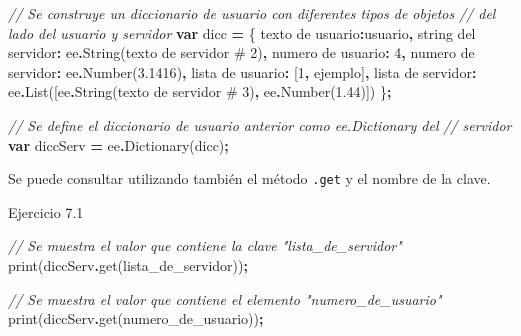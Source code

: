 \documentclass[
  12pt,
  letterpaper,
  twoside]{book}
\newenvironment{Shaded}{\begin{snugshade}}{\end{snugshade}}
\newcommand{\CommentTok}[1]{\textcolor[rgb]{0.56,0.35,0.01}{\textit{#1}}}
\newcommand{\DecValTok}[1]{\textcolor[rgb]{0.00,0.00,0.81}{#1}}
\newcommand{\FloatTok}[1]{\textcolor[rgb]{0.00,0.00,0.81}{#1}}
\newcommand{\FunctionTok}[1]{\textcolor[rgb]{0.00,0.00,0.00}{#1}}
\newcommand{\KeywordTok}[1]{\textcolor[rgb]{0.13,0.29,0.53}{\textbf{#1}}}
\newcommand{\NormalTok}[1]{#1}
\newcommand{\OperatorTok}[1]{\textcolor[rgb]{0.81,0.36,0.00}{\textbf{#1}}}
\newcommand{\StringTok}[1]{\textcolor[rgb]{0.31,0.60,0.02}{#1}}
\begin{document}
\begin{Shaded}
\begin{Highlighting}[]
\CommentTok{// Se construye un diccionario de usuario con diferentes tipos de objetos}
\CommentTok{// del lado del usuario y servidor}
\KeywordTok{var}\NormalTok{ dicc }\OperatorTok{=}\NormalTok{ \{                                                 }
  \StringTok{\textquotesingle{}texto de usuario\textquotesingle{}}\OperatorTok{:}\StringTok{\textquotesingle{}usuario\textquotesingle{}}\OperatorTok{,}
  \StringTok{\textquotesingle{}string del servidor\textquotesingle{}}\OperatorTok{:}\NormalTok{ ee}\OperatorTok{.}\FunctionTok{String}\NormalTok{(}\StringTok{\textquotesingle{}texto de servidor \# 2\textquotesingle{}}\NormalTok{)}\OperatorTok{,}
  \StringTok{\textquotesingle{}numero de usuario\textquotesingle{}}\OperatorTok{:} \DecValTok{4}\OperatorTok{,}
  \StringTok{\textquotesingle{}numero de servidor\textquotesingle{}}\OperatorTok{:}\NormalTok{ ee}\OperatorTok{.}\FunctionTok{Number}\NormalTok{(}\FloatTok{3.1416}\NormalTok{)}\OperatorTok{,}
  \StringTok{\textquotesingle{}lista de usuario\textquotesingle{}}\OperatorTok{:}\NormalTok{ [}\DecValTok{1}\OperatorTok{,} \StringTok{\textquotesingle{}ejemplo\textquotesingle{}}\NormalTok{]}\OperatorTok{,}
  \StringTok{\textquotesingle{}lista de servidor\textquotesingle{}}\OperatorTok{:}\NormalTok{ ee}\OperatorTok{.}\FunctionTok{List}\NormalTok{([ee}\OperatorTok{.}\FunctionTok{String}\NormalTok{(}\StringTok{\textquotesingle{}texto de servidor \# 3\textquotesingle{}}\NormalTok{)}\OperatorTok{,} 
\NormalTok{    ee}\OperatorTok{.}\FunctionTok{Number}\NormalTok{(}\FloatTok{1.44}\NormalTok{)])}
\NormalTok{\}}\OperatorTok{;} 

\CommentTok{// Se define el diccionario de usuario anterior como ee.Dictionary del }
\CommentTok{// servidor }
\KeywordTok{var}\NormalTok{ diccServ }\OperatorTok{=}\NormalTok{ ee}\OperatorTok{.}\FunctionTok{Dictionary}\NormalTok{(dicc)}\OperatorTok{;}     
\end{Highlighting}
\end{Shaded}

Se puede consultar utilizando también el método \texttt{.get} y el nombre de la clave.

Ejercicio 7.1

\begin{Shaded}
\begin{Highlighting}[]
\CommentTok{// Se muestra el valor que contiene la clave "lista\_de\_servidor"}
\FunctionTok{print}\NormalTok{(diccServ}\OperatorTok{.}\FunctionTok{get}\NormalTok{(}\StringTok{\textquotesingle{}lista\_de\_servidor\textquotesingle{}}\NormalTok{))}\OperatorTok{;}

\CommentTok{// Se muestra el valor que contiene el elemento "numero\_de\_usuario"   }
\FunctionTok{print}\NormalTok{(diccServ}\OperatorTok{.}\FunctionTok{get}\NormalTok{(}\StringTok{\textquotesingle{}numero\_de\_usuario\textquotesingle{}}\NormalTok{))}\OperatorTok{;}        
\end{Highlighting}
\end{Shaded}
\end{document}
